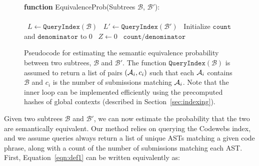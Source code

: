 \begin{figure}
\begin{center}
\begin{algorithm2e}[H]
{\bf function} {\sc EquivalenceProb}\xspace(Subtrees $\mathcal{B}$, $\mathcal{B}'$): \\ 
\mbox{}\\
\ $L \leftarrow \texttt{QueryIndex}(\mathcal{B})$ \;
\ $L' \leftarrow \texttt{QueryIndex}(\mathcal{B'})$ \;
\ Initialize $\texttt{count}$ and $\texttt{denominator}$ to 0\;
\ $Z \leftarrow 0$\;
\ForEach{AST $\AST_i \in L$}{ 
	\If{$\AST_i\backslash \mathcal{B} = \AST_i'\backslash \mathcal{B}'$ for some $\AST_i'\in L'$}{
\	$w_i \leftarrow c_i*c_i'$ \;
\	$\texttt{count} \leftarrow \texttt{count} + w_i$ if $F[\AST_i]=F[\AST_i']$ \;
\	$\texttt{denominator} \leftarrow \texttt{denominator} + w $ \;
	}
}
\ \Return $\texttt{count}/\texttt{denominator}$ \;
\caption[Algorithm for estimating semantic equivalence]{Pseudocode for estimating the semantic equivalence probability between two subtrees, $\mathcal{B}$ and $\mathcal{B}'$.  
The function $\texttt{QueryIndex}(\mathcal{B})$ is assumed to return a list of pairs $(\mathcal{A}_i,c_i)$ such that each $\mathcal{A}_i$ contains $\mathcal{B}$
and $c_i$ is the number of submissions matching $\mathcal{A}_i$.   Note that the inner loop can be implemented efficiently using 
the precomputed hashes of global contexts (described in Section~\ref{sec:indexing}).
}
\label{alg:estimate}
\end{algorithm2e}
\end{center}
\end{figure}

\mbox{}
Given two subtrees $\mathcal{B}$ and $\mathcal{B}'$, we can now estimate the probability
that the two are semantically equivalent.   Our method relies on querying the Codewebs index, and 
we assume queries always return a list of unique ASTs matching a given code phrase, along with a count of the number of submissions 
matching each AST.
First, Equation~\ref{eqn:def1} can be written equivalently as:

